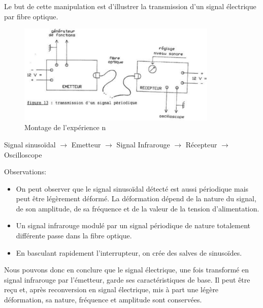 \documentclass[a4paper]{article}
\begin{document}
Le but de cette manipulation est d’illustrer la transmission d’un signal électrique par fibre optique.

\begin{figure}[H]
    \centering
    \includegraphics[width=0.85\textwidth]{images/montage04.PNG}
    \caption{Montage de l'expérience n}
    \label{fig:montage04}
\end{figure}

\begin{center}
    Signal sinusoïdal $\rightarrow$ Emetteur $\rightarrow$ Signal Infrarouge $\rightarrow$ Récepteur $\rightarrow$ Oscilloscope 
\end{center}

Observations:
\begin{itemize}
    \item On peut observer que le signal sinusoïdal détecté est aussi périodique mais peut être légèrement déformé. La déformation dépend de la nature du signal, de son amplitude, de sa fréquence et de la valeur de la tension d’alimentation.
    \item Un signal infrarouge modulé par un signal périodique de nature totalement différente passe dans la fibre optique.
    \item En basculant rapidement l’interrupteur, on crée des salves de sinusoïdes.
\end{itemize}

Nous pouvons donc en conclure que le signal électrique, une fois transformé en signal infrarouge par l’émetteur, garde ses caractéristiques de base. Il peut être reçu et, après reconversion en signal électrique, mis à part une légère déformation, sa nature, fréquence et amplitude sont conservées.
\end{document}
